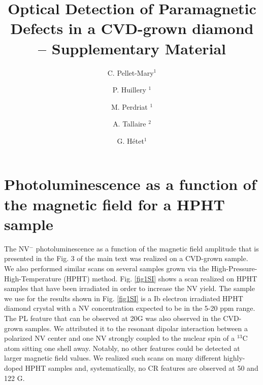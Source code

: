 \documentclass[9pt,twocolumn,twoside]{revtex4-1}
\begin{document}
\title{Optical Detection of Paramagnetic Defects in a CVD-grown diamond\\-- Supplementary Material}

\author{C. Pellet-Mary$^{1}$}
\author{P. Huillery $^{1}$}
\author{M. Perdriat $^{1}$}
\author{A. Tallaire $^{2}$}
\author{G. H\'etet$^{1}$} 



\maketitle

\section{Photoluminescence as a function of the magnetic field for a HPHT sample}

The NV$^-$ photoluminescence as a function of the magnetic field amplitude that is presented in the Fig. 3 of the main text was realized on a CVD-grown sample. 
We also performed similar scans on several samples grown via the High-Pressure-High-Temperature (HPHT) method. 
Fig. \ref{fig1SI} shows a scan realized on HPHT samples that have been irradiated in order to increase the NV yield. 
The sample we use for the results shown in Fig. \ref{fig1SI} is a Ib electron irradiated HPHT diamond crystal with a NV concentration expected to be in the 5-20 ppm range.
The PL feature that can be observed at 20G was also observed in the CVD-grown samples. We attributed it to the resonant dipolar interaction between a polarized NV center and one NV strongly coupled to the nuclear spin of a $^{13}$C atom sitting one shell away.
Notably, no other features could be detected at larger magnetic field values. We realized such scans on many different highly-doped HPHT samples and, systematically, no CR features are observed at 50 and 122 G. 
\end{document}
